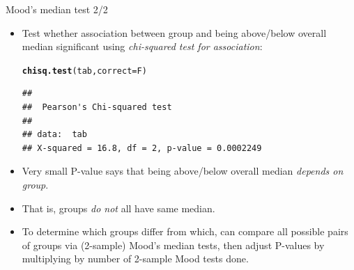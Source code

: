 \documentclass[unknownkeysallowed]{beamer}\usepackage[]{graphicx}\usepackage[]{color}
\makeatletter
\newcommand{\hlstd}[1]{\textcolor[rgb]{0.345,0.345,0.345}{#1}}%
\newcommand{\hlkwc}[1]{\textcolor[rgb]{0.333,0.667,0.333}{#1}}%
\newcommand{\hlkwd}[1]{\textcolor[rgb]{0.737,0.353,0.396}{\textbf{#1}}}%
\newenvironment{kframe}{%
 \def\at@end@of@kframe{}%
 \ifinner\ifhmode%
  \def\at@end@of@kframe{\end{minipage}}%
  \begin{minipage}{\columnwidth}%
 \fi\fi%
 \def\FrameCommand##1{\hskip\@totalleftmargin \hskip-\fboxsep
 \colorbox{shadecolor}{##1}\hskip-\fboxsep
     \hskip-\linewidth \hskip-\@totalleftmargin \hskip\columnwidth}%
 \MakeFramed {\advance\hsize-\width
   \@totalleftmargin\z@ \linewidth\hsize
   \@setminipage}}%
 {\par\unskip\endMakeFramed%
 \at@end@of@kframe}
\newenvironment{knitrout}{}{} %
\makeatother
\begin{document}
\begin{frame}[fragile]{Mood's median test 2/2}
  
  \begin{itemize}
  \item Test whether association between group and being above/below
    overall median significant using \emph{chi-squared test for association}:
    
\begin{knitrout}
\color{fgcolor}\begin{kframe}
\begin{alltt}
\hlkwd{chisq.test}\hlstd{(tab,}\hlkwc{correct}\hlstd{=F)}
\end{alltt}
\begin{verbatim}
## 
## 	Pearson's Chi-squared test
## 
## data:  tab
## X-squared = 16.8, df = 2, p-value = 0.0002249
\end{verbatim}
\end{kframe}
\end{knitrout}

\item Very small P-value says that being above/below overall median
  \emph{depends on group}.
\item That is, groups \emph{do not} all have same median.
  
\item To determine which groups differ from which, can compare all
  possible pairs of groups via (2-sample) Mood's median tests, then
  adjust P-values by multiplying by number of 2-sample Mood tests done.
  \end{itemize}
  
\end{frame}
\end{document}
